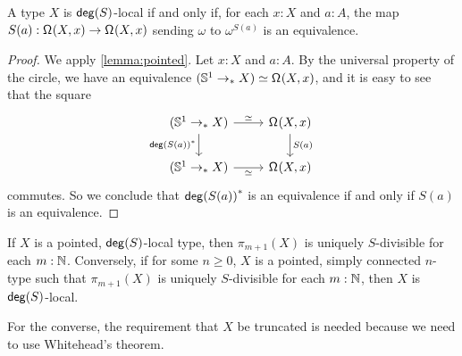 \begin{lem}
A type $X$ is $\mathsf{deg}(S)$-local if and only if, for each $x:X$ and $a:A$, the map
$S(a) : \mathsf{\Omega}^{}(X,x) \to \mathsf{\Omega}^{}(X,x)$ sending 
$\omega$ to $\omega^{S(a)}$ is an equivalence.
\end{lem}

\begin{proof}
We apply \cref{lemma:pointed}.
Let $x:X$ and $a:A$.
By the universal property of the circle, we have an equivalence
$(\mathbb{S}^{1} \to_{\ast} X) \simeq \mathsf{\Omega}^{}(X,x)$,
and it is easy to see that the square
\[
  \begin{tikzcd}
    (\sphere{1} \pto X) \arrow[r,"\simeq"] \arrow[d,swap,"\precomp{\degg(S(a))}"] & \loopspace{X,x} \arrow[d,"S(a)"] \\
    (\sphere{1} \pto X) \arrow[r,swap,"\simeq"] & \loopspace{X,x}
  \end{tikzcd}
\]
commutes.
So we conclude that ${\mathsf{deg}(S(a))}^\ast$ is an equivalence if and only if $S(a)$ is an equivalence.
\end{proof}

\begin{prp}\label{prop:homotopygroupsoflocalarelocal}
    If $X$ is a pointed, $\mathsf{deg}(S)$-local type, then $\pi_{m+1}(X)$ is uniquely $S$-divisible
    for each $m : \mathbb{N}$.
    Conversely, if for some $n \geq 0$, $X$ is a pointed, simply connected $n$-type
    such that $\pi_{m+1}(X)$ is uniquely $S$-divisible for each $m : \mathbb{N}$,
    then $X$ is $\mathsf{deg}(S)$-local.
\end{prp}

For the converse, the requirement that $X$ be truncated is needed because
we need to use Whitehead's theorem.

